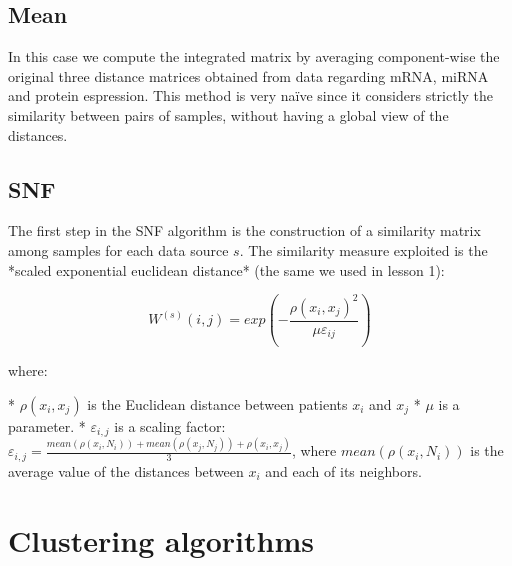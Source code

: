 \subsection{Mean}
In this case we compute the integrated matrix by averaging component-wise the original three distance matrices obtained from data regarding mRNA, miRNA and protein espression. This method is very naïve since it considers strictly the similarity between pairs of samples, without having a global view of the distances.

\subsection{SNF}


The first step in the SNF algorithm is the construction of a similarity matrix
among samples for each data source $s$. The similarity measure exploited is the 
*scaled exponential euclidean distance* (the same we used in lesson 1):

\begin{equation}
    \label{eq:scaled_exponential_sim}
    W^{(s)}(i,j) = exp \left(- \frac{\rho(x_i,x_j)^2}{\mu \varepsilon_{ij}}\right)
\end{equation}

where:

* $\rho(x_i, x_j)$ is the  Euclidean  distance  between  patients \(x_i\) and \(x_j\)
* $\mu$ is a parameter.
* $\varepsilon_{i,j}$ is a scaling factor: $\varepsilon_{i,j} = \frac{mean(\rho(x_i, N_i)) + mean(\rho(x_j, N_j)) + \rho(x_i, x_j)}{3}$, where  \(mean(\rho(x_i, N_i))\) is the average value of the distances between \(x_i\) and each of its neighbors.


\section{Clustering algorithms}